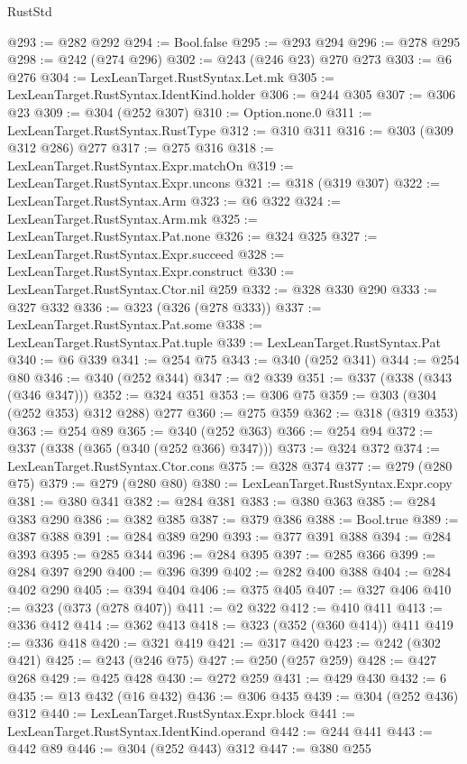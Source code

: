 \begin{lexlean}{RustStd}
\begin{coremodule}
@293 := @282 @292
@294 := Bool.false
@295 := @293 @294
@296 := @278 @295
@298 := @242 (@274 @296)
@302 := @243 (@246 @23) @270 @273
@303 := @6 @276
@304 := LexLeanTarget.RustSyntax.Let.mk
@305 := LexLeanTarget.RustSyntax.IdentKind.holder
@306 := @244 @305
@307 := @306 @23
@309 := @304 (@252 @307)
@310 := Option.none.{0}
@311 := LexLeanTarget.RustSyntax.RustType
@312 := @310 @311
@316 := @303 (@309 @312 @286) @277
@317 := @275 @316
@318 := LexLeanTarget.RustSyntax.Expr.matchOn
@319 := LexLeanTarget.RustSyntax.Expr.uncons
@321 := @318 (@319 @307)
@322 := LexLeanTarget.RustSyntax.Arm
@323 := @6 @322
@324 := LexLeanTarget.RustSyntax.Arm.mk
@325 := LexLeanTarget.RustSyntax.Pat.none
@326 := @324 @325
@327 := LexLeanTarget.RustSyntax.Expr.succeed
@328 := LexLeanTarget.RustSyntax.Expr.construct
@330 := LexLeanTarget.RustSyntax.Ctor.nil @259
@332 := @328 @330 @290
@333 := @327 @332
@336 := @323 (@326 (@278 @333))
@337 := LexLeanTarget.RustSyntax.Pat.some
@338 := LexLeanTarget.RustSyntax.Pat.tuple
@339 := LexLeanTarget.RustSyntax.Pat
@340 := @6 @339
@341 := @254 @75
@343 := @340 (@252 @341)
@344 := @254 @80
@346 := @340 (@252 @344)
@347 := @2 @339
@351 := @337 (@338 (@343 (@346 @347)))
@352 := @324 @351
@353 := @306 @75
@359 := @303 (@304 (@252 @353) @312 @288) @277
@360 := @275 @359
@362 := @318 (@319 @353)
@363 := @254 @89
@365 := @340 (@252 @363)
@366 := @254 @94
@372 := @337 (@338 (@365 (@340 (@252 @366) @347)))
@373 := @324 @372
@374 := LexLeanTarget.RustSyntax.Ctor.cons
@375 := @328 @374
@377 := @279 (@280 @75)
@379 := @279 (@280 @80)
@380 := LexLeanTarget.RustSyntax.Expr.copy
@381 := @380 @341
@382 := @284 @381
@383 := @380 @363
@385 := @284 @383 @290
@386 := @382 @385
@387 := @379 @386
@388 := Bool.true
@389 := @387 @388
@391 := @284 @389 @290
@393 := @377 @391 @388
@394 := @284 @393
@395 := @285 @344
@396 := @284 @395
@397 := @285 @366
@399 := @284 @397 @290
@400 := @396 @399
@402 := @282 @400 @388
@404 := @284 @402 @290
@405 := @394 @404
@406 := @375 @405
@407 := @327 @406
@410 := @323 (@373 (@278 @407))
@411 := @2 @322
@412 := @410 @411
@413 := @336 @412
@414 := @362 @413
@418 := @323 (@352 (@360 @414)) @411
@419 := @336 @418
@420 := @321 @419
@421 := @317 @420
@423 := @242 (@302 @421)
@425 := @243 (@246 @75)
@427 := @250 (@257 @259)
@428 := @427 @268
@429 := @425 @428
@430 := @272 @259
@431 := @429 @430
@432 := 6
@435 := @13 @432 (@16 @432)
@436 := @306 @435
@439 := @304 (@252 @436) @312
@440 := LexLeanTarget.RustSyntax.Expr.block
@441 := LexLeanTarget.RustSyntax.IdentKind.operand
@442 := @244 @441
@443 := @442 @89
@446 := @304 (@252 @443) @312
@447 := @380 @255

\end{coremodule}
\end{lexlean}

